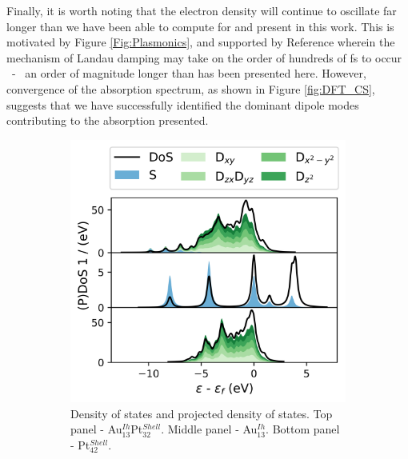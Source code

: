 Finally, it is worth noting that the electron density will continue to oscillate far longer than we have been able to compute for and present in this work. This is motivated by Figure \ref{Fig:Plasmonics}, and supported by Reference \cite{AuPlasmonRev} wherein the mechanism of Landau damping may take on the order of hundreds of fs to occur ~-~ an order of magnitude longer than has been presented here. However, convergence of the absorption spectrum, as shown in Figure \ref{fig:DFT_CS}, suggests that we have successfully identified the dominant dipole modes contributing to the absorption presented.

\begin{figure}
\centering
    \begin{subfigure}{0.45\textwidth}
        \includegraphics[width=\textwidth]{figures/LM/Atomistic/AuPt_CS_DoS.png}
        \caption{Density of states and projected density of states. Top panel - Au$_{13}^{Ih}$Pt$_{32}^{Shell}$. Middle panel - Au$_{13}^{Ih}$. Bottom panel - Pt$_{42}^{Shell}$.}
        \label{fig:CS_DoS}
    \end{subfigure}
    \begin{subfigure}{0.45\textwidth}

\end{subfigure}
\end{figure}
